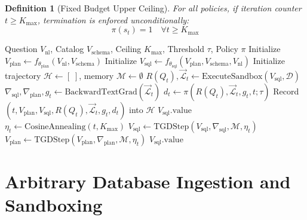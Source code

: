 \documentclass[conference]{IEEEtran}
\newtheorem{definition}{Definition}
\begin{document}
\begin{definition}[Fixed Budget Upper Ceiling]
For all policies, if iteration counter $t \ge K_{\max}$, termination is enforced unconditionally:
\begin{equation}
    \pi(s_t) = 1 \quad \forall t \ge K_{\max}
\end{equation}
\end{definition}

\begin{algorithm}[t]
\caption{AxiomSQL Optimization with Adaptive Stopping}
\label{alg:axiomsql}
\begin{algorithmic}[1]
\REQUIRE Question $V_{\text{nl}}$, Catalog $V_{\text{schema}}$, Ceiling $K_{\max}$, Threshold $\tau$, Policy $\pi$
\STATE Initialize $V_{\text{plan}} \leftarrow f_{\theta_{\text{plan}}}(V_{\text{nl}}, V_{\text{schema}})$
\STATE Initialize $V_{\text{sql}} \leftarrow f_{\theta_{\text{sql}}}(V_{\text{plan}}, V_{\text{schema}}, V_{\text{nl}})$
\STATE Initialize trajectory $\mathcal{H} \leftarrow [\;]$, memory $\mathcal{M} \leftarrow \emptyset$
    \STATE $R(Q_t), \vec{\mathcal{L}}_t \leftarrow \text{ExecuteSandbox}(V_{\text{sql}}, \mathcal{D})$
    \STATE $\nabla_{\text{sql}}, \nabla_{\text{plan}}, g_t \leftarrow \text{BackwardTextGrad}(\vec{\mathcal{L}}_t)$
    \STATE $d_t \leftarrow \pi(R(Q_t), \vec{\mathcal{L}}_t, g_t, t; \tau)$
    \STATE Record $(t, V_{\text{plan}}, V_{\text{sql}}, R(Q_t), \vec{\mathcal{L}}_t, g_t, d_t)$ into $\mathcal{H}$
        \RETURN $V_{\text{sql}}.\text{value}$ 
    \ENDIF
    \STATE $\eta_t \leftarrow \text{CosineAnnealing}(t, K_{\max})$
    \STATE $V_{\text{sql}} \leftarrow \text{TGDStep}(V_{\text{sql}}, \nabla_{\text{sql}}, \mathcal{M}, \eta_t)$
    \STATE $V_{\text{plan}} \leftarrow \text{TGDStep}(V_{\text{plan}}, \nabla_{\text{plan}}, \mathcal{M}, \eta_t)$
\ENDFOR
\RETURN $V_{\text{sql}}.\text{value}$
\end{algorithmic}
\end{algorithm}

\section{Arbitrary Database Ingestion and Sandboxing}
\end{document}
